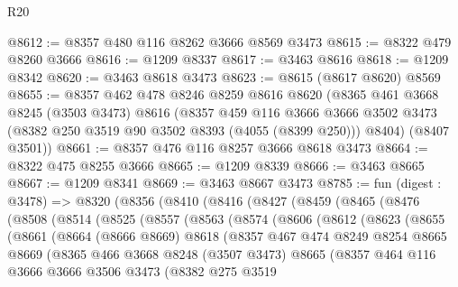 \begin{lexlean}{R20}
\begin{coremodule}
@8612 := @8357 @480 @116 @8262 @3666 @8569 @3473
@8615 := @8322 @479 @8260 @3666
@8616 := @1209 @8337
@8617 := @3463 @8616
@8618 := @1209 @8342
@8620 := @3463 @8618 @3473
@8623 := @8615 (@8617 @8620) @8569
@8655 := @8357
    @462
    @478
    @8246
    @8259
    @8616
    @8620
    (@8365
      @461
      @3668
      @8245
      (@3503 @3473)
      @8616
      (@8357
        @459
        @116
        @3666
        @3666
        @3502
        @3473
        (@8382 @250 @3519 @90 @3502 @8393 (@4055 (@8399 @250)))
        @8404)
      (@8407 @3501))
@8661 := @8357 @476 @116 @8257 @3666 @8618 @3473
@8664 := @8322 @475 @8255 @3666
@8665 := @1209 @8339
@8666 := @3463 @8665
@8667 := @1209 @8341
@8669 := @3463 @8667 @3473
@8785 := fun (digest : @3478) =>
  @8320
    (@8356
      (@8410
        (@8416
          (@8427
            (@8459
              (@8465
                (@8476
                  (@8508
                    (@8514
                      (@8525
                        (@8557
                          (@8563
                            (@8574
                              (@8606
                                (@8612
                                  (@8623
                                    (@8655
                                      (@8661
                                        (@8664
                                          (@8666 @8669)
                                          @8618
                                          (@8357
                                            @467
                                            @474
                                            @8249
                                            @8254
                                            @8665
                                            @8669
                                            (@8365
                                              @466
                                              @3668
                                              @8248
                                              (@3507 @3473)
                                              @8665
                                              (@8357
                                                @464
                                                @116
                                                @3666
                                                @3666
                                                @3506
                                                @3473
                                                (@8382
                                                  @275
                                                  @3519

\end{coremodule}
\end{lexlean}
